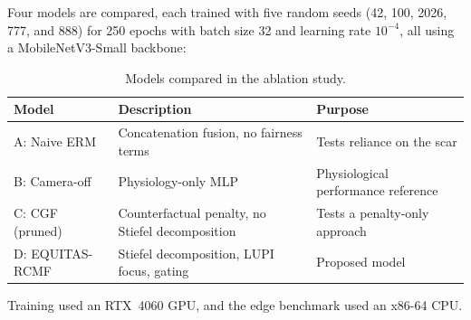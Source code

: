 Four models are compared, each trained with five random seeds (42, 100, 2026, 777, and 888) for 250 epochs with batch size 32 and learning rate $10^{-4}$, all using a MobileNetV3-Small backbone:
\begin{table}[htbp]
\centering
\begin{tabular}{@{}lll@{}}
\toprule
\textbf{Model} & \textbf{Description} & \textbf{Purpose} \\
\midrule
A: Naive ERM & Concatenation fusion, no fairness terms & Tests reliance on the scar \\
B: Camera-off & Physiology-only MLP & Physiological performance reference \\
C: CGF (pruned) & Counterfactual penalty, no Stiefel decomposition & Tests a penalty-only approach \\
D: EQUITAS-RCMF & Stiefel decomposition, LUPI focus, gating & Proposed model \\
\bottomrule
\end{tabular}
\caption{Models compared in the ablation study.}
\label{tab:ablation_models}
\end{table}

Training used an RTX~4060 GPU, and the edge benchmark used an x86-64 CPU.
